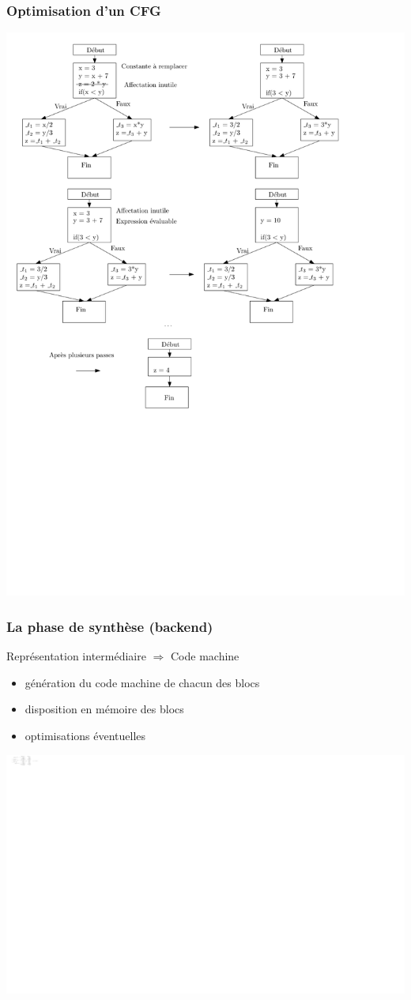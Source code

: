 \documentclass{beamer}
\begin{document}
\begin{frame}
\frametitle{Optimisation d'un CFG}

\centering\includegraphics[width=0.7\columnwidth]{Figs/three_adresses_optimisation.pdf}

\end{frame}

\begin{frame}
\frametitle{La phase de synthèse (backend)}
\begin{block}{Représentation intermédiaire $\Rightarrow$ Code machine}
\begin{itemize}
\item génération du code machine de chacun des blocs
\item disposition en mémoire des blocs
\item optimisations éventuelles
\end{itemize}
\end{block}

\centering\includegraphics[width=\columnwidth]{Figs/compilation_synthese.pdf}

\end{frame}
\end{document}
